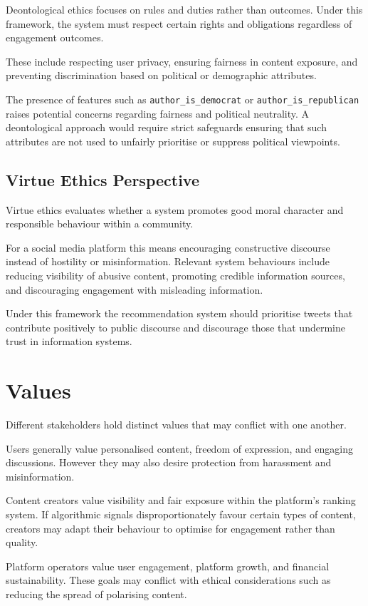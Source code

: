 \documentclass[]
{UCD_CS_41820_Report}
\begin{document}
Deontological ethics focuses on rules and duties rather than outcomes. Under this framework, the 
system must respect certain rights and obligations regardless of engagement outcomes.

These include respecting user privacy, ensuring fairness in content exposure, and preventing 
discrimination based on political or demographic attributes.

The presence of features such as \texttt{author\_is\_democrat} or \texttt{author\_is\_republican} 
raises potential concerns regarding fairness and political neutrality. A deontological approach 
would require strict safeguards ensuring that such attributes are not used to unfairly prioritise 
or suppress political viewpoints.

\subsection{Virtue Ethics Perspective}

Virtue ethics evaluates whether a system promotes good moral character and responsible behaviour 
within a community.

For a social media platform this means encouraging constructive discourse instead of hostility or 
misinformation. Relevant system behaviours include reducing visibility of abusive content, 
promoting credible information sources, and discouraging engagement with misleading information.

Under this framework the recommendation system should prioritise tweets that contribute positively 
to public discourse and discourage those that undermine trust in information systems.

\section{Values}

Different stakeholders hold distinct values that may conflict with one another.

Users generally value personalised content, freedom of expression, and engaging discussions. 
However they may also desire protection from harassment and misinformation.

Content creators value visibility and fair exposure within the platform's ranking system. If 
algorithmic signals disproportionately favour certain types of content, creators may adapt their 
behaviour to optimise for engagement rather than quality.

Platform operators value user engagement, platform growth, and financial sustainability. These 
goals may conflict with ethical considerations such as reducing the spread of polarising content.
\end{document}
